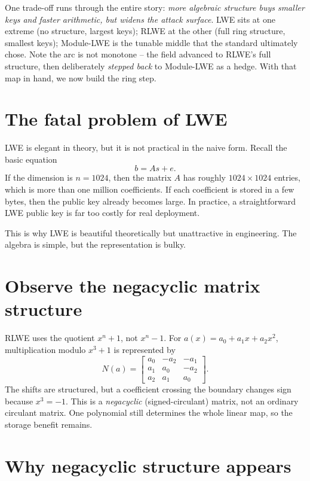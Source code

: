One trade-off runs through the entire story: \emph{more algebraic structure buys smaller keys and faster arithmetic, but widens the attack surface}. LWE sits at one extreme (no structure, largest keys); RLWE at the other (full ring structure, smallest keys); Module-LWE is the tunable middle that the standard ultimately chose. Note the arc is not monotone -- the field advanced to RLWE's full structure, then deliberately \emph{stepped back} to Module-LWE as a hedge. With that map in hand, we now build the ring step.

\section{The fatal problem of LWE}

LWE is elegant in theory, but it is not practical in the naive form. Recall the basic equation
\[
b = A s + e.
\]
If the dimension is $n=1024$, then the matrix $A$ has roughly $1024\times 1024$ entries, which is more than one million coefficients. If each coefficient is stored in a few bytes, then the public key already becomes large. In practice, a straightforward LWE public key is far too costly for real deployment.

This is why LWE is beautiful theoretically but unattractive in engineering. The algebra is simple, but the representation is bulky.

\section{Observe the negacyclic matrix structure}

RLWE uses the quotient $x^n+1$, not $x^n-1$. For $a(x)=a_0+a_1x+a_2x^2$, multiplication modulo $x^3+1$ is represented by
\[
N(a)=\begin{bmatrix}
a_0&-a_2&-a_1\\
a_1&a_0&-a_2\\
a_2&a_1&a_0
\end{bmatrix}.
\]
The shifts are structured, but a coefficient crossing the boundary changes sign because $x^3=-1$. This is a \emph{negacyclic} (signed-circulant) matrix, not an ordinary circulant matrix. One polynomial still determines the whole linear map, so the storage benefit remains.

\section{Why negacyclic structure appears}

